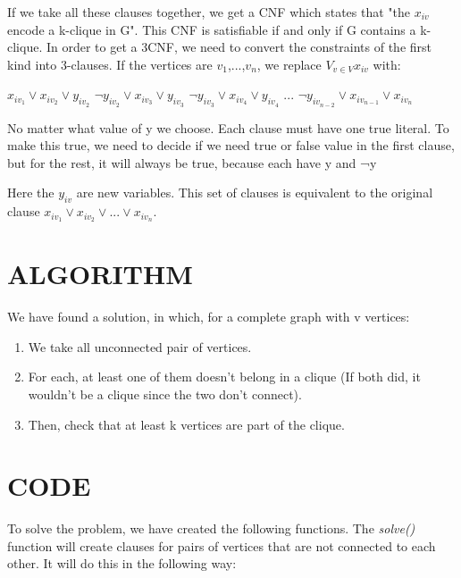 \documentclass[table]{article}
\begin{document}
\leftskip=0.5in
If we take all these clauses together, we get a CNF which states that "the $x_{iv}$ encode a k-clique in G". This CNF is satisfiable if and only if G contains a k-clique.
In order to get a 3CNF, we need to convert the constraints of the first kind into 3-clauses. If the vertices are $v_1$,...,$v_n$, we replace $V_{v \in V} x_{iv}$ with:

\begin{center}
$x_{iv_1} \lor x_{iv_2} \lor y_{iv_2} $ \newline
$\neg y_{iv_2} \lor x_{iv_3} \lor y_{iv_3} $ \newline
$\neg y_{iv_3} \lor x_{iv_4} \lor y_{iv_4} $ \newline
... \newline
$\neg y_{iv_{n-2}} \lor x_{iv_{n-1}} \lor x_{iv_n} $ \newline
\end{center}

No matter what value of y we choose. Each clause must have one true literal. To make this true, we need to decide if we need true or false value in the first clause, but for the rest, it will always be true, because each have y and ¬y

\leftskip=0.5in 
Here the $y_{iv}$ are new variables. This set of clauses is equivalent to the original clause $x_{iv_1} \lor x_{iv_2} \lor ... \lor x_{iv_n} $.

\leftskip=0.0in  
\section{ALGORITHM}

\leftskip=0.5in  
We have found a solution, in which, for a complete graph with v vertices:
\begin{enumerate}\leftskip=0.8in 
\item We take all unconnected pair of vertices.
\item For each, at least one of them doesn't belong in a clique (If both did, it wouldn't be a clique since the two don't connect).
\item Then, check that at least k vertices are part of the clique.
\end{enumerate}

\leftskip=0.0in  
\section{CODE}

\leftskip=0.5in  
To solve the problem, we have created the following functions.
The \textit{solve()} function will create clauses for pairs of vertices that are not connected to each other. It will do this in the following way: \newline
\end{document}

